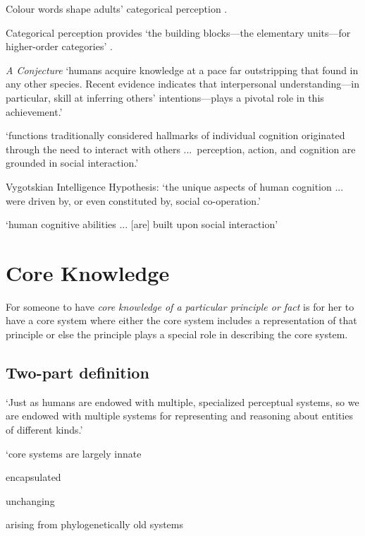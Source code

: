 \documentclass[12pt]{extarticle}
\begin{document}
\begin{multicols}{3}
Colour words shape adults’ categorical perception \citep{Roberson:2007wg,Winawer:2007im}.
 
Categorical perception provides ‘the building blocks—the elementary units—for higher-order categories’
\citep[p.\ 3]{Harnad:1987ej}.
 
\emph{A Conjecture}
‘humans acquire knowledge at a pace far outstripping that found in any other species. 
Recent evidence indicates that interpersonal understanding—in particular, skill at 
inferring others’ intentions—plays a pivotal role in this achievement.’
\citep[p.\ 40]{Baldwin:2000qq}
 
‘functions traditionally considered hallmarks of individual cognition originated through the need to interact with others ...\ perception, action, and cognition are grounded in social interaction.’
\citep[p.\ 103]{Knoblich:2006bn}
 
Vygotskian Intelligence Hypothesis:
‘the unique aspects of human cognition ... were driven by, or even constituted by, social co-operation.’
\citep[p.\ 1]{Moll:2007gu}
 
‘human cognitive abilities ... [are] built upon social interaction’
\citep{sinigaglia:2008_roots} %
 
 
 
\section{Core Knowledge}
 
For someone to have \textit{core knowledge of a particular principle or fact} is for her to have a core system where 
            either the core system includes a representation of that principle or else the principle plays a special role in describing the core system.
 
\subsection{Two-part definition}
 
‘Just as humans are endowed with multiple, specialized perceptual systems, so we are endowed with multiple systems for representing and reasoning about entities of different kinds.’
\citep[p.\ 517]{Carey:1996hl}
 
‘core systems are 
largely innate 

              
encapsulated 

              
unchanging 

              
arising from phylogenetically old systems 


\end{multicols}
\end{document}
